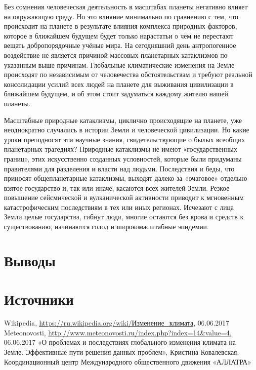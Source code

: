 \documentclass[a5paper,10pt]{article}
\begin{document}
			Без сомнения человеческая деятельность в масштабах планеты негативно влияет на окружающую среду. Но это влияние минимально по сравнению с тем, что происходит на планете в результате влияния комплекса природных факторов, которое в ближайшем будущем будет только нарастатьи о чём не перестают вещать добропорядочные учёные мира. На сегодняшний день антропогенное воздействие не является причиной массовых планетарных катаклизмов по указанным выше причинам. Глобальные климатические изменения на Земле происходят по независимым от человечества обстоятельствам и требуют реальной консолидации усилий всех людей на планете для выживания цивилизации в ближайшем будущем, и об этом стоит задуматься каждому жителю нашей планеты.

			Масштабные природные катаклизмы, циклично происходящие на планете, уже неоднократно случались в истории Земли и человеческой цивилизации. Но какие уроки преподносят эти научные знания, свидетельствующие о былых всеобщих планетарных трагедиях? Природные катаклизмы не имеют «государственных границ», этих искусственно созданных условностей, которые были придуманы правителями для разделения и власти над людьми. Последствия и беды, что приносят общепланетарные катаклизмы, выходят далеко за «очаговое» отдельно взятое государство и, так или иначе, касаются всех жителей Земли. Резкое повышение сейсмической и вулканической активности приводит к мгновенным катастрофическим последствиям в тех или иных регионах. Исчезают с лица Земли целые государства, гибнут люди, многие остаются без крова и средств к существованию, начинаются голод и широкомасштабные эпидемии.\cite{allatra}

		\newpage

	\section{Выводы}

		\newpage

	\section{Источники}
		\begin{thebibliography}{9}
			 Wikipedia, \url{https://ru.wikipedia.org/wiki/Изменение_климата}, 06.06.2017
			 Meteonovosti, \url{http://www.meteonovosti.ru/index.php?index=14&value=4}, 06.06.2017
			 «О проблемах и последствиях глобального изменения климата на Земле. Эффективные пути решения данных проблем», Кристина Ковалевская, Координационный центр Международного общественного движения «АЛЛАТРА»
		\end{thebibliography}
\end{document}
